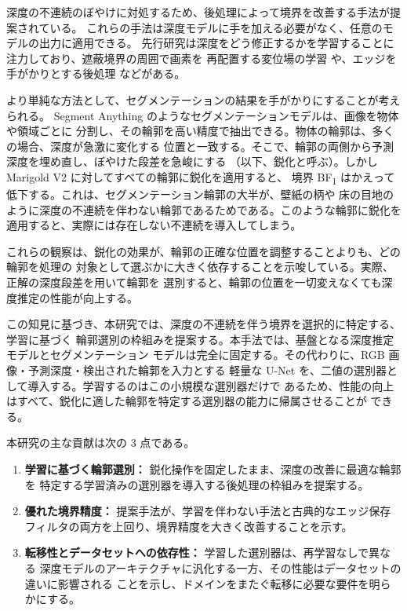 \documentclass[conference]{IEEEtran}
\newcommand{\bfone}{BF\textsubscript{1}}
\begin{document}
深度の不連続のぼやけに対処するため、後処理によって境界を改善する手法が提案されている。
これらの手法は深度モデルに手を加える必要がなく、任意のモデルの出力に適用できる。
先行研究は深度をどう修正するかを学習することに注力しており、遮蔽境界の周囲で画素を
再配置する変位場の学習 \cite{ramamonjisoa} や、エッジを手がかりとする後処理
\cite{edgeguided} などがある。

より単純な方法として、セグメンテーションの結果を手がかりにすることが考えられる。
Segment Anything \cite{sam} のようなセグメンテーションモデルは、画像を物体や領域ごとに
分割し、その輪郭を高い精度で抽出できる。物体の輪郭は、多くの場合、深度が急激に変化する
位置と一致する。そこで、輪郭の両側から予測深度を埋め直し、ぼやけた段差を急峻にする
（以下、鋭化と呼ぶ）。しかし Marigold V2 に対してすべての輪郭に鋭化を適用すると、
境界 \bfone{} はかえって低下する。これは、セグメンテーション輪郭の大半が、壁紙の柄や
床の目地のように深度の不連続を伴わない輪郭であるためである。このような輪郭に鋭化を
適用すると、実際には存在しない不連続を導入してしまう。

これらの観察は、鋭化の効果が、輪郭の正確な位置を調整することよりも、どの輪郭を処理の
対象として選ぶかに大きく依存することを示唆している。実際、正解の深度段差を用いて輪郭を
選別すると、輪郭の位置を一切変えなくても深度推定の性能が向上する。

この知見に基づき、本研究では、深度の不連続を伴う境界を選択的に特定する、学習に基づく
輪郭選別の枠組みを提案する。本手法では、基盤となる深度推定モデルとセグメンテーション
モデルは完全に固定する。その代わりに、RGB 画像・予測深度・検出された輪郭を入力とする
軽量な U-Net を、二値の選別器として導入する。学習するのはこの小規模な選別器だけで
あるため、性能の向上はすべて、鋭化に適した輪郭を特定する選別器の能力に帰属させることが
できる。

本研究の主な貢献は次の 3 点である。

\begin{enumerate}
\item \textbf{学習に基づく輪郭選別：} 鋭化操作を固定したまま、深度の改善に最適な輪郭を
      特定する学習済みの選別器を導入する後処理の枠組みを提案する。
\item \textbf{優れた境界精度：} 提案手法が、学習を伴わない手法と古典的なエッジ保存
      フィルタの両方を上回り、境界精度を大きく改善することを示す。
\item \textbf{転移性とデータセットへの依存性：} 学習した選別器は、再学習なしで異なる
      深度モデルのアーキテクチャに汎化する一方、その性能はデータセットの違いに影響される
      ことを示し、ドメインをまたぐ転移に必要な要件を明らかにする。
\end{enumerate}
\end{document}
